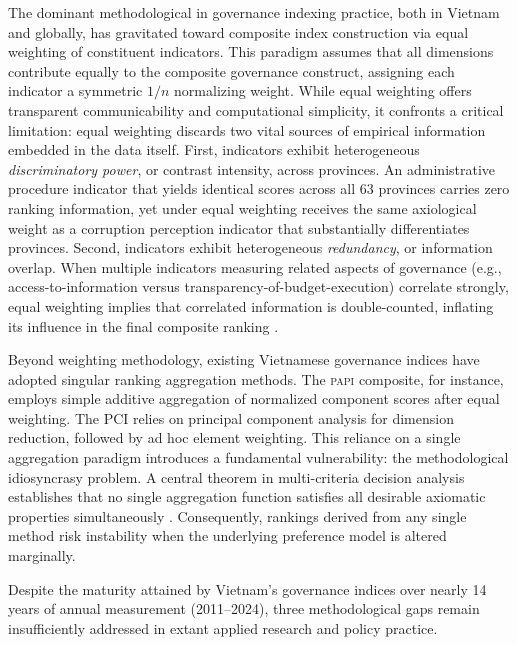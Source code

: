 \documentclass[12pt,a4paper]{article}
\newcommand{\PAPI}{\textsc{papi}\xspace}
\begin{document}
The dominant methodological in governance indexing practice, both in Vietnam and globally, has gravitated toward composite index construction via equal weighting of constituent indicators. This paradigm assumes that all dimensions contribute equally to the composite governance construct, assigning each indicator a symmetric $1/n$ normalizing weight. While equal weighting offers transparent communicability and computational simplicity, it confronts a critical limitation: equal weighting discards two vital sources of empirical information embedded in the data itself. First, indicators exhibit heterogeneous \emph{discriminatory power}, or contrast intensity, across provinces. An administrative procedure indicator that yields identical scores across all 63 provinces carries zero ranking information, yet under equal weighting receives the same axiological weight as a corruption perception indicator that substantially differentiates provinces. Second, indicators exhibit heterogeneous \emph{redundancy}, or information overlap. When multiple indicators measuring related aspects of governance (e.g., access-to-information versus transparency-of-budget-execution) correlate strongly, equal weighting implies that correlated information is double-counted, inflating its influence in the final composite ranking \citep{Diakoulaki1995, Greco2016}.

Beyond weighting methodology, existing Vietnamese governance indices have adopted singular ranking aggregation methods. The \PAPI composite, for instance, employs simple additive aggregation of normalized component scores after equal weighting. The PCI relies on principal component analysis for dimension reduction, followed by ad hoc element weighting. This reliance on a single aggregation paradigm introduces a fundamental vulnerability: the methodological idiosyncrasy problem. A central theorem in multi-criteria decision analysis establishes that no single aggregation function satisfies all desirable axiomatic properties simultaneously \citep{Arrow1951}. Consequently, rankings derived from any single method risk instability when the underlying preference model is altered marginally.


Despite the maturity attained by Vietnam's governance indices over nearly 14 years of annual measurement (2011--2024), three methodological gaps remain insufficiently addressed in extant applied research and policy practice.
\end{document}
